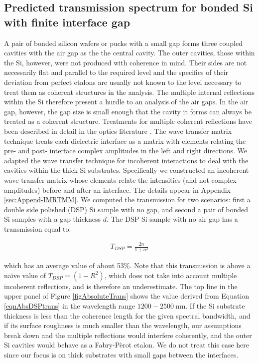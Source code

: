 \subsection{Predicted transmission spectrum for bonded Si with finite interface gap}
A pair of bonded silicon wafers or pucks with a small gap forms three coupled cavities with the air gap as the the central cavity.  The outer cavities, those within the Si, however, were not produced with coherence in mind.  Their sides are not necessarily flat and parallel to the required level and the specifics of their deviation from perfect etalons are usually not known to the level necessary to treat them as coherent structures in the analysis.  The multiple internal reflections within the Si therefore present a hurdle to an analysis of the air gaps.  In the air gap, however, the gap size is small enough that the cavity it forms can always be treated as a coherent structure.  Treatments for multiple coherent reflections have been described in detail in the optics literature \cite{2007fuph.book.....S}.  The wave transfer matrix technique treats each dielectric interface as a matrix with elements relating the pre- and post- interface complex amplitudes in the left and right directions.  We adapted the wave transfer technique for incoherent interactions \cite{2002ApOpt..41.3978K} to deal with the cavities within the thick Si substrates.  Specifically we constructed an incoherent wave transfer matrix whose elements relate the intensities (and not complex amplitudes) before and after an interface.  The details appear in Appendix \ref{sec:Append-IMRTMM}.  We computed the transmission for two scenarios: first a double side polished (DSP) Si sample with no gap, and second a pair of bonded Si samples with a gap thickness $d$.  The DSP Si sample with no air gap has a transmission equal to:

\begin{eqnarray}
T_{DSP} = \frac{2n}{1+n^2} \label{eqnAbsDSPtrans}
\end{eqnarray}

which has an average value of about 53\%.  Note that this transmission is above a na\"ive value of $T_{DSP}=(1-R^2)$, which does not take into account multiple incoherent reflections, and is therefore an underestimate.  The top line in the upper panel of Figure \ref{figAbsoluteTrans} shows the value derived from Equation \ref{eqnAbsDSPtrans} in the wavelength range $1200-2500\;$nm.  If the Si substrate thickness is less than the coherence length for the given spectral bandwidth, and if its surface roughness is much smaller than the wavelength, our assumptions break down and the multiple reflections would interfere coherently, and the outer Si cavities would behave as a Fabry-P\`erot etalon.  We do not treat this case here since our focus is on thick substrates with small gaps between the interfaces.


